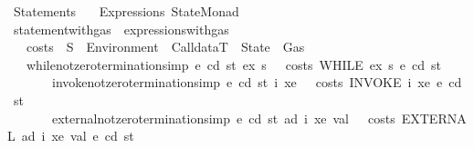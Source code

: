 %
\begin{isabellebody}%
%
%
\isadelimdocument
%
\endisadelimdocument
%
\isatagdocument
%
\isamarkuptrue%
%
\endisatagdocument
{\isafolddocument}%
%
\isadelimdocument
%
\endisadelimdocument
%
\isadelimtheory
%
\endisadelimtheory
%
\isatagtheory
{}\isamarkupfalse%
\ Statements\isanewline
\ \ \ Expressions\ StateMonad\isanewline
{}%
\endisatagtheory
{\isafoldtheory}%
%
\isadelimtheory
\isanewline
%
\endisadelimtheory
\ \ \ \ \ \ \ \ \ \ \ \ \ \ \ \ \ \ \ \ \ \ \ \ \ \ \ \ \ \ \ \ \ \ \ \isanewline
{}\isamarkupfalse%
\ statement{\isacharunderscore}{\kern0pt}with{\isacharunderscore}{\kern0pt}gas\ {\isacharequal}{\kern0pt}\ expressions{\isacharunderscore}{\kern0pt}with{\isacharunderscore}{\kern0pt}gas\ {\isacharplus}{\kern0pt}\isanewline
\ \ \ costs\ {\isacharcolon}{\kern0pt}{\isacharcolon}{\kern0pt}\ {\isachardoublequoteopen}S\ {\isasymRightarrow}\ Environment\ {\isasymRightarrow}\ CalldataT\ {\isasymRightarrow}\ State\ {\isasymRightarrow}\ Gas{\isachardoublequoteclose}\isanewline
\ \ \ while{\isacharunderscore}{\kern0pt}not{\isacharunderscore}{\kern0pt}zero{\isacharbrackleft}{\kern0pt}termination{\isacharunderscore}{\kern0pt}simp{\isacharbrackright}{\kern0pt}{\isacharcolon}{\kern0pt}\ {\isachardoublequoteopen}{\isasymAnd}e\ cd\ st\ ex\ s{}{\isachardot}{\kern0pt}\ {}\ {\isacharless}{\kern0pt}\ {\isacharparenleft}{\kern0pt}costs\ {\isacharparenleft}{\kern0pt}WHILE\ ex\ s{}{\isacharparenright}{\kern0pt}\ e\ cd\ st{\isacharparenright}{\kern0pt}\ {\isachardoublequoteclose}\isanewline
\ \ \ \ \ \ \ invoke{\isacharunderscore}{\kern0pt}not{\isacharunderscore}{\kern0pt}zero{\isacharbrackleft}{\kern0pt}termination{\isacharunderscore}{\kern0pt}simp{\isacharbrackright}{\kern0pt}{\isacharcolon}{\kern0pt}\ {\isachardoublequoteopen}{\isasymAnd}e\ cd\ st\ i\ xe{\isachardot}{\kern0pt}\ {}\ {\isacharless}{\kern0pt}\ {\isacharparenleft}{\kern0pt}costs\ {\isacharparenleft}{\kern0pt}INVOKE\ i\ xe{\isacharparenright}{\kern0pt}\ e\ cd\ st{\isacharparenright}{\kern0pt}{\isachardoublequoteclose}\isanewline
\ \ \ \ \ \ \ external{\isacharunderscore}{\kern0pt}not{\isacharunderscore}{\kern0pt}zero{\isacharbrackleft}{\kern0pt}termination{\isacharunderscore}{\kern0pt}simp{\isacharbrackright}{\kern0pt}{\isacharcolon}{\kern0pt}\ {\isachardoublequoteopen}{\isasymAnd}e\ cd\ st\ ad\ i\ xe\ val{\isachardot}{\kern0pt}\ {}\ {\isacharless}{\kern0pt}\ {\isacharparenleft}{\kern0pt}costs\ {\isacharparenleft}{\kern0pt}EXTERNAL\ ad\ i\ xe\ val{\isacharparenright}{\kern0pt}\ e\ cd\ st{\isacharparenright}{\kern0pt}{\isachardoublequoteclose}\isanewline

\end{isabellebody}
